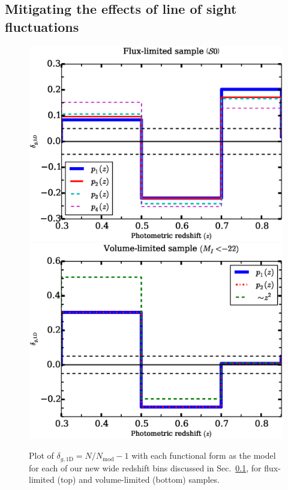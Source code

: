 \documentclass[twocolumn,useAMS,usenatbib]{mn2e}
\begin{document}
\subsection{Mitigating the effects of line of sight fluctuations}\label{sec:mitigation}

\begin{figure}
 \centering
 \includegraphics[width=1.0\columnwidth]{redshift_fluxlimited_wide}
 \includegraphics[width=1.0\columnwidth]{redshift_vollimited_wide}
 \caption{Plot of $\delta_{g,\text{1D}} =  N/N_{\text{mod}}-1$ with each functional form as the model
           for each of our new wide redshift bins discussed in Sec.~\ref{sec:mitigation}, for flux-limited (top) and
           volume-limited (bottom) samples.
          }
 \label{fig:redshift_wide}          
\end{figure}
\end{document}
